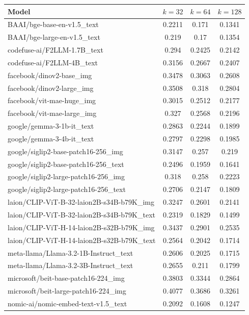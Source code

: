 \begin{table}[ht]
\centering
\begin{tabular}{lccc}
\hline
Model & $k=32$ & $k=64$ & $k=128$ \\
\hline
BAAI/bge-base-en-v1.5\_text & 0.2211 & 0.171 & 0.1341 \\
BAAI/bge-large-en-v1.5\_text & 0.219 & 0.17 & 0.1354 \\
codefuse-ai/F2LLM-1.7B\_text & 0.294 & 0.2425 & 0.2142 \\
codefuse-ai/F2LLM-4B\_text & 0.3156 & 0.2667 & 0.2407 \\
facebook/dinov2-base\_img & 0.3478 & 0.3063 & 0.2608 \\
facebook/dinov2-large\_img & 0.3508 & 0.318 & 0.2804 \\
facebook/vit-mae-huge\_img & 0.3015 & 0.2512 & 0.2177 \\
facebook/vit-mae-large\_img & 0.327 & 0.2568 & 0.2196 \\
google/gemma-3-1b-it\_text & 0.2863 & 0.2244 & 0.1899 \\
google/gemma-3-4b-it\_text & 0.2797 & 0.2298 & 0.1985 \\
google/siglip2-base-patch16-256\_img & 0.3147 & 0.257 & 0.219 \\
google/siglip2-base-patch16-256\_text & 0.2496 & 0.1959 & 0.1641 \\
google/siglip2-large-patch16-256\_img & 0.318 & 0.258 & 0.2223 \\
google/siglip2-large-patch16-256\_text & 0.2706 & 0.2147 & 0.1809 \\
laion/CLIP-ViT-B-32-laion2B-s34B-b79K\_img & 0.3247 & 0.2601 & 0.2141 \\
laion/CLIP-ViT-B-32-laion2B-s34B-b79K\_text & 0.2319 & 0.1829 & 0.1499 \\
laion/CLIP-ViT-H-14-laion2B-s32B-b79K\_img & 0.3437 & 0.2901 & 0.2535 \\
laion/CLIP-ViT-H-14-laion2B-s32B-b79K\_text & 0.2564 & 0.2042 & 0.1714 \\
meta-llama/Llama-3.2-1B-Instruct\_text & 0.2606 & 0.2025 & 0.1715 \\
meta-llama/Llama-3.2-3B-Instruct\_text & 0.2655 & 0.211 & 0.1799 \\
microsoft/beit-base-patch16-224\_img & 0.3803 & 0.3344 & 0.2864 \\
microsoft/beit-large-patch16-224\_img & 0.4077 & 0.3686 & 0.3261 \\
nomic-ai/nomic-embed-text-v1.5\_text & 0.2092 & 0.1608 & 0.1247 \\

\end{tabular}
\end{table}
